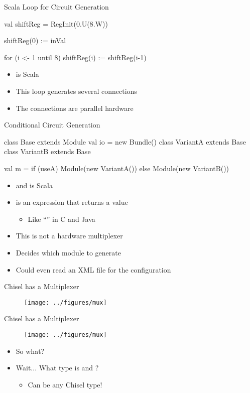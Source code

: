 \begin{frame}[fragile]{Scala  Loop for Circuit Generation}
\begin{chisel}
val shiftReg = RegInit(0.U(8.W))

shiftReg(0) := inVal

for (i <- 1 until 8) {
  shiftReg(i) := shiftReg(i-1)
}
\end{chisel}
\begin{itemize}
\item {} is Scala
\item This loop generates several connections
\item The connections are parallel hardware
\end{itemize}
\end{frame}

\begin{frame}[fragile]{Conditional Circuit Generation}
\begin{chisel}
class Base extends Module { val io = new Bundle() }
class VariantA extends Base { }
class VariantB extends Base { }

val m = if (useA) Module(new VariantA())
        else Module(new VariantB())
\end{chisel}
\begin{itemize}
\item {} and  is Scala
\item {} is an expression that returns a value
\begin{itemize}
\item Like ``'' in C and Java
\end{itemize}
\item This is not a hardware multiplexer
\item Decides which module to generate
\item Could even read an XML file for the configuration
\end{itemize}
\end{frame}

\begin{frame}[fragile]{Chisel has a Multiplexer}
\begin{figure}
  \texttt{[image: ../figures/mux]}
\end{figure}
\end{frame}

\begin{frame}[fragile]{Chisel has a Multiplexer}
\begin{figure}
  \texttt{[image: ../figures/mux]}
\end{figure}
\begin{itemize}
\item So what?
\item Wait... What type is  and ?
\begin{itemize}
\item Can be any Chisel type!
\end{itemize}
\end{itemize}
\end{frame}

